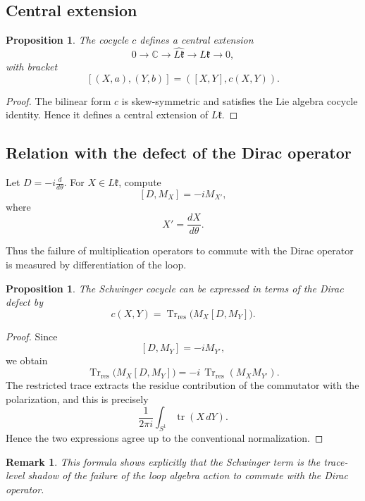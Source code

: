 \documentclass[11pt]{amsart}
\newtheorem{proposition}[definition]{Proposition}
\newtheorem{remark}[definition]{Remark}
\begin{document}
\subsection{Central extension}

\begin{proposition}
The cocycle \(c\) defines a central extension
\[
0\longrightarrow \mathbb C
\longrightarrow
\widehat{L\mathfrak k}
\longrightarrow
L\mathfrak k
\longrightarrow 0,
\]
with bracket
\[
[(X,a),(Y,b)]
=
([X,Y],c(X,Y)).
\]
\end{proposition}

\begin{proof}
The bilinear form \(c\) is skew-symmetric and satisfies the Lie algebra cocycle identity. Hence it defines a central extension of \(L\mathfrak k\).
\end{proof}

\subsection{Relation with the defect of the Dirac operator}

Let \(D=-i\frac{d}{d\theta}\). For \(X\in L\mathfrak k\), compute
\[
[D,M_X]
=
-iM_{X'},
\]
where
\[
X'=\frac{dX}{d\theta}.
\]

Thus the failure of multiplication operators to commute with the Dirac operator is measured by differentiation of the loop.

\begin{proposition}
The Schwinger cocycle can be expressed in terms of the Dirac defect by
\[
c(X,Y)
=
\operatorname{Tr}_{\mathrm{res}}
\bigl(
M_X[D,M_Y]
\bigr).
\]
\end{proposition}

\begin{proof}
Since
\[
[D,M_Y]=-iM_{Y'},
\]
we obtain
\[
\operatorname{Tr}_{\mathrm{res}}
\bigl(M_X[D,M_Y]\bigr)
=
-i\,\operatorname{Tr}_{\mathrm{res}}(M_XM_{Y'}).
\]
The restricted trace extracts the residue contribution of the commutator with the polarization, and this is precisely
\[
\frac{1}{2\pi i}
\int_{S^1}\operatorname{tr}(X\,dY).
\]
Hence the two expressions agree up to the conventional normalization.
\end{proof}

\begin{remark}
This formula shows explicitly that the Schwinger term is the trace-level shadow of the failure of the loop algebra action to commute with the Dirac operator.
\end{remark}
\end{document}
